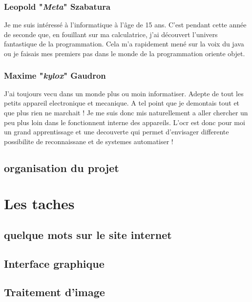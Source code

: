 \documentclass{article}
\begin{document}
\subsubsection{Leopold "\textit{Meta}" Szabatura}
Je me suis intéressé à l'informatique à l’âge de 15 ans.
C'est pendant cette année de seconde que, en fouillant sur ma calculatrice, j'ai découvert l'univers fantastique de la programmation.
Cela m'a rapidement mené sur la voix du java ou je faisais mes premiers pas dans le monde de la programmation oriente objet.
\subsubsection{Maxime "\textit{kylox}" Gaudron}
J'ai toujours vecu dans un monde plus ou moin informatiser. Adepte de tout les petits appareil electronique et mecanique. A tel point que je demontais tout et que plus rien ne marchait ! Je me suis donc mis naturellement a aller chercher un peu plus loin dans le fonctionnent interne des appareils. L'ocr est donc pour moi un grand apprentissage et une decouverte qui permet d'envisager differente possibilite de reconnaissane et de systemes automatiser ! 
\subsection{organisation du projet}
\newpage
\section{Les taches}
\subsection{quelque mots sur le site internet}
\subsection{Interface graphique}
\subsection{Traitement d'image}
\end{document}
